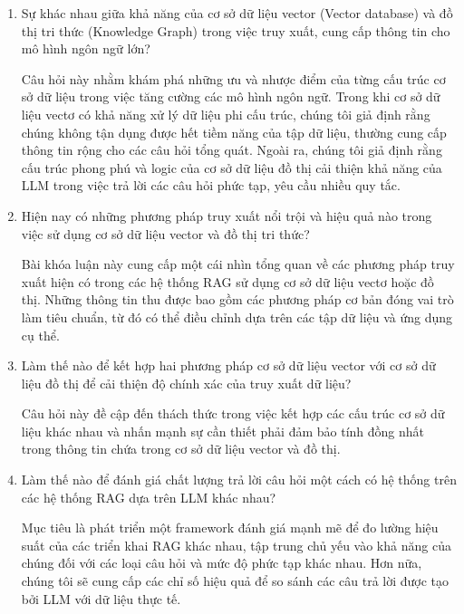 \begin{enumerate}
      \item Sự khác nhau giữa khả năng của cơ sở dữ liệu vector (Vector database) và đồ thị tri thức (Knowledge Graph) trong việc truy xuất, cung cấp thông tin cho mô hình ngôn ngữ lớn?

            Câu hỏi này nhằm khám phá những ưu và nhược điểm của từng cấu trúc cơ sở dữ liệu trong việc tăng cường các mô hình ngôn ngữ. Trong khi cơ sở dữ liệu vectơ có khả năng xử lý dữ liệu phi cấu trúc, chúng tôi giả định rằng chúng không tận dụng được hết tiềm năng của tập dữ liệu, thường cung cấp thông tin rộng cho các câu hỏi tổng quát. Ngoài ra, chúng tôi giả định rằng cấu trúc phong phú và logic của cơ sở dữ liệu đồ thị cải thiện khả năng của LLM trong việc trả lời các câu hỏi phức tạp, yêu cầu nhiều quy tắc.

      \item Hiện nay có những phương pháp truy xuất nổi trội và hiệu quả nào trong việc sử dụng cơ sở dữ liệu vector và đồ thị tri thức?

            Bài khóa luận này cung cấp một cái nhìn tổng quan về các phương pháp truy xuất hiện có trong các hệ thống RAG sử dụng cơ sở dữ liệu vectơ hoặc đồ thị. Những thông tin thu được bao gồm các phương pháp cơ bản đóng vai trò làm tiêu chuẩn, từ đó có thể điều chỉnh dựa trên các tập dữ liệu và ứng dụng cụ thể.

      \item Làm thế nào để kết hợp hai phương pháp cơ sở dữ liệu vector với cơ sở dữ liệu đồ thị để cải thiện độ chính xác của truy xuất dữ liệu?

            Câu hỏi này đề cập đến thách thức trong việc kết hợp các cấu trúc cơ sở dữ liệu khác nhau và nhấn mạnh sự cần thiết phải đảm bảo tính đồng nhất trong thông tin chứa trong cơ sở dữ liệu vector và đồ thị.

      \item Làm thế nào để đánh giá chất lượng trả lời câu hỏi một cách có hệ thống trên các hệ thống RAG dựa trên LLM khác nhau?

            Mục tiêu là phát triển một framework đánh giá mạnh mẽ để đo lường hiệu suất của các triển khai RAG khác nhau, tập trung chủ yếu vào khả năng của chúng đối với các loại câu hỏi và mức độ phức tạp khác nhau. Hơn nữa, chúng tôi sẽ cung cấp các chỉ số hiệu quả để so sánh các câu trả lời được tạo bởi LLM với dữ liệu thực tế.

\end{enumerate}

